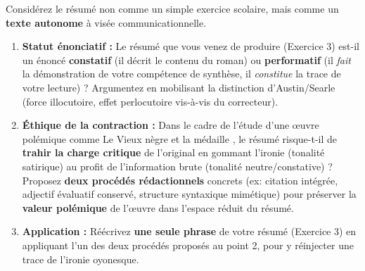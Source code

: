 \documentclass[11pt]{article}
\begin{document}
\begin{exercice}
Considérez le résumé non comme un simple exercice scolaire, mais comme un \textbf{texte autonome} à visée communicationnelle.
\begin{enumerate}
    \item \textbf{Statut énonciatif :} Le résumé que vous venez de produire (Exercice 3) est-il un énoncé \textbf{constatif} (il décrit le contenu du roman) ou \textbf{performatif} (il \textit{fait} la démonstration de votre compétence de synthèse, il \textit{constitue} la trace de votre lecture) ? Argumentez en mobilisant la distinction d'Austin/Searle (force illocutoire, effet perlocutoire vis-à-vis du correcteur).
    \item \textbf{Éthique de la contraction :} Dans le cadre de l'étude d'une œuvre polémique comme \og Le Vieux nègre et la médaille \fg{}, le résumé risque-t-il de \textbf{trahir la charge critique} de l'original en gommant l'ironie (tonalité satirique) au profit de l'information brute (tonalité neutre/constative) ? Proposez \textbf{deux procédés rédactionnels} concrets (ex: citation intégrée, adjectif évaluatif conservé, structure syntaxique mimétique) pour préserver la \textbf{valeur polémique} de l'œuvre dans l'espace réduit du résumé.
    \item \textbf{Application :} Réécrivez \textbf{une seule phrase} de votre résumé (Exercice 3) en appliquant l'un des deux procédés proposés au point 2, pour y réinjecter une trace de l'ironie oyonesque.
\end{enumerate}
\end{exercice}
\end{document}
